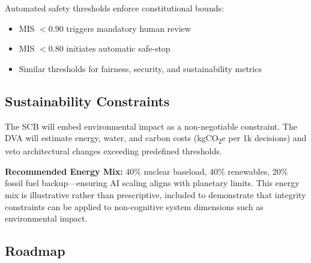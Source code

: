 \documentclass[11pt,letterpaper]{article}
\begin{document}
Automated safety thresholds enforce constitutional bounds:
\begin{itemize}
    \item MIS $< 0.90$ triggers mandatory human review
    \item MIS $< 0.80$ initiates automatic safe-stop
    \item Similar thresholds for fairness, security, and sustainability metrics
\end{itemize}

\subsection{Sustainability Constraints}

The SCB will embed environmental impact as a non-negotiable constraint. The DVA will estimate energy, water, and carbon costs (kgCO\textsubscript{2}e per 1k decisions) and veto architectural changes exceeding predefined thresholds.

\textbf{Recommended Energy Mix:} 40\% nuclear baseload, 40\% renewables, 20\% fossil fuel backup—ensuring AI scaling aligns with planetary limits. This energy mix is illustrative rather than prescriptive, included to demonstrate that integrity constraints can be applied to non-cognitive system dimensions such as environmental impact.

\subsection{Roadmap}
\end{document}
